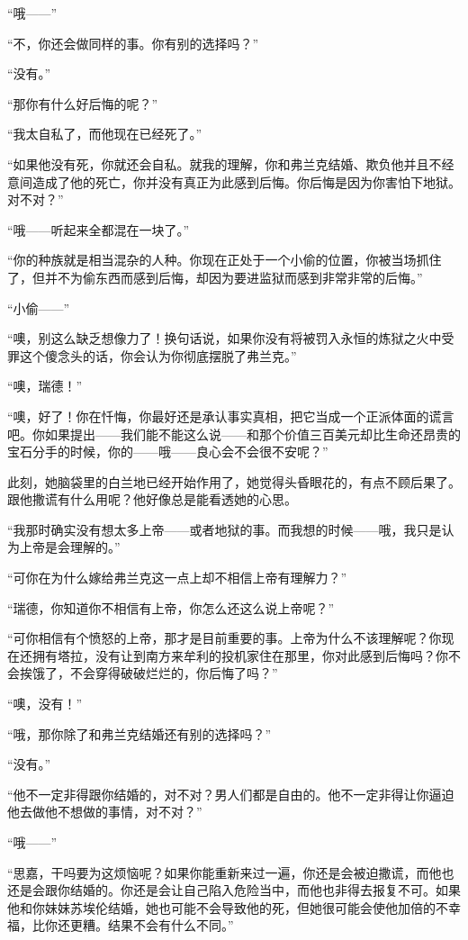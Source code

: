 \par “哦——”
\par “不，你还会做同样的事。你有别的选择吗？”
\par “没有。”
\par “那你有什么好后悔的呢？”
\par “我太自私了，而他现在已经死了。”
\par “如果他没有死，你就还会自私。就我的理解，你和弗兰克结婚、欺负他并且不经意间造成了他的死亡，你并没有真正为此感到后悔。你后悔是因为你害怕下地狱。对不对？”
\par “哦——听起来全都混在一块了。”
\par “你的种族就是相当混杂的人种。你现在正处于一个小偷的位置，你被当场抓住了，但并不为偷东西而感到后悔，却因为要进监狱而感到非常非常的后悔。”
\par “小偷——”
\par “噢，别这么缺乏想像力了！换句话说，如果你没有将被罚入永恒的炼狱之火中受罪这个傻念头的话，你会认为你彻底摆脱了弗兰克。”
\par “噢，瑞德！”
\par “噢，好了！你在忏悔，你最好还是承认事实真相，把它当成一个正派体面的谎言吧。你如果提出——我们能不能这么说——和那个价值三百美元却比生命还昂贵的宝石分手的时候，你的——哦——良心会不会很不安呢？”
\par 此刻，她脑袋里的白兰地已经开始作用了，她觉得头昏眼花的，有点不顾后果了。跟他撒谎有什么用呢？他好像总是能看透她的心思。
\par “我那时确实没有想太多上帝——或者地狱的事。而我想的时候——哦，我只是认为上帝是会理解的。”
\par “可你在为什么嫁给弗兰克这一点上却不相信上帝有理解力？”
\par “瑞德，你知道你不相信有上帝，你怎么还这么说上帝呢？”
\par “可你相信有个愤怒的上帝，那才是目前重要的事。上帝为什么不该理解呢？你现在还拥有塔拉，没有让到南方来牟利的投机家住在那里，你对此感到后悔吗？你不会挨饿了，不会穿得破破烂烂的，你后悔了吗？”
\par “噢，没有！”
\par “哦，那你除了和弗兰克结婚还有别的选择吗？”
\par “没有。”
\par “他不一定非得跟你结婚的，对不对？男人们都是自由的。他不一定非得让你逼迫他去做他不想做的事情，对不对？”
\par “哦——”
\par “思嘉，干吗要为这烦恼呢？如果你能重新来过一遍，你还是会被迫撒谎，而他也还是会跟你结婚的。你还是会让自己陷入危险当中，而他也非得去报复不可。如果他和你妹妹苏埃伦结婚，她也可能不会导致他的死，但她很可能会使他加倍的不幸福，比你还更糟。结果不会有什么不同。”
